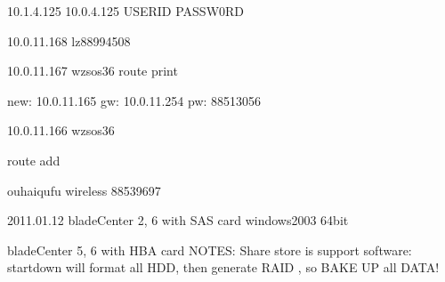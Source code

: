 10.1.4.125
10.0.4.125
USERID
PASSW0RD

10.0.11.168
lz88994508

10.0.11.167
wzsos36
route print

new: 10.0.11.165
gw:  10.0.11.254
pw: 88513056

10.0.11.166
wzsos36

route add

ouhaiqufu
wireless 88539697


2011.01.12
bladeCenter 2, 6 with SAS card
windows2003 64bit

bladeCenter 5, 6 with HBA card
NOTES:
Share store is support
software: startdown
will format all HDD, then generate RAID , so BAKE UP all DATA!

